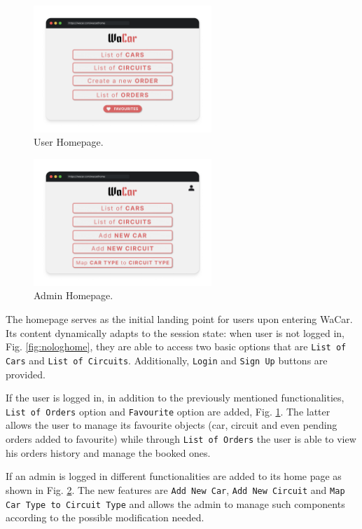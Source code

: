 \begin{figure}[h]
    \centering
    \includegraphics[width=0.6\textwidth]{mockup/UserHome.png}
    \caption{User Homepage.}
    \label{fig:usehome}
\end{figure}

\begin{figure}[h]
    \centering
    \includegraphics[width=0.6\textwidth]{mockup/AdminHome.png}
    \caption{Admin Homepage.}
    \label{fig:adminhome}
\end{figure}

The homepage serves as the initial landing point for users upon entering WaCar. Its content dynamically adapts to the session state: when user is not logged in, Fig. \ref{fig:nologhome}, they are able to access two basic options that are \texttt{List of Cars} and \texttt{List of Circuits}. Additionally, \texttt{Login} and \texttt{Sign Up} buttons are provided.

If the user is logged in, in addition to the previously mentioned functionalities, \texttt{List of Orders} option and \texttt{Favourite} option are added, Fig. \ref{fig:usehome}. The latter allows the user to manage its favourite objects (car, circuit and even pending orders added to favourite) while through \texttt{List of Orders} the user is able to view his orders history and manage the booked ones.

If an admin is logged in different functionalities are added to its home page as shown in Fig. \ref{fig:adminhome}. The new features are \texttt{Add New Car}, \texttt{Add New Circuit} and \texttt{Map Car Type to Circuit Type} and allows the admin to manage such components according to the possible modification needed.

